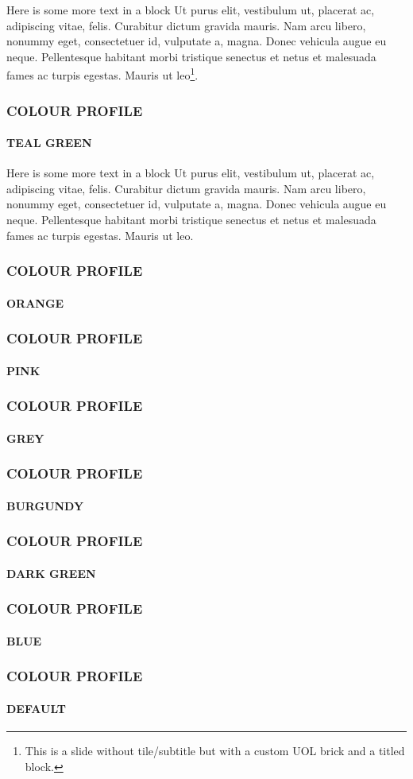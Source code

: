 \documentclass[
aspectratio=169,
]{beamer}
\begin{document}
\begin{frame}[uolcolours=Teal Green]
    \begin{block}{Here is some more text in a block}
        Ut purus elit, vestibulum ut, placerat ac, adipiscing vitae, felis. Curabitur dictum
gravida mauris. Nam arcu libero, nonummy eget, consectetuer id, vulputate a, magna.
Donec vehicula augue eu neque. Pellentesque habitant morbi tristique senectus et
netus et malesuada fames ac turpis egestas.
        Mauris ut leo\footnote{This is a slide without tile/subtitle but with a custom UOL brick and a titled block.}.
    \end{block}
\end{frame}
\begin{frame}[uolcolours=Teal Green]
    \frametitle{COLOUR PROFILE}
    \framesubtitle{TEAL GREEN}
    \democontent
\end{frame}

\begin{frame}
    \begin{block}{Here is some more text in a block}
        Ut purus elit, vestibulum ut, placerat ac, adipiscing vitae, felis. Curabitur dictum
gravida mauris. Nam arcu libero, nonummy eget, consectetuer id, vulputate a, magna.
Donec vehicula augue eu neque. Pellentesque habitant morbi tristique senectus et
netus et malesuada fames ac turpis egestas. Mauris ut leo.
    \end{block}
\end{frame}

\begin{frame}
    \frametitle{COLOUR PROFILE}
    \framesubtitle{ORANGE}
    \democontent
\end{frame}


\begin{frame}[uolcolours=Pink]
    \frametitle{COLOUR PROFILE}
    \framesubtitle{PINK}
    \democontent
\end{frame}

\begin{frame}[uolcolours=Grey]
    \frametitle{COLOUR PROFILE}
    \framesubtitle{GREY}
    \democontent
\end{frame}

\begin{frame}[uolcolours=Burgundy]
    \frametitle{COLOUR PROFILE}
    \framesubtitle{BURGUNDY}
    \democontent
\end{frame}

\begin{frame}[uolcolours=Dark Green]
    \frametitle{COLOUR PROFILE}
    \framesubtitle{DARK GREEN}
    \democontent
\end{frame}

\begin{frame}[uolcolours=Blue]
    \frametitle{COLOUR PROFILE}
    \framesubtitle{BLUE}
    \democontent
\end{frame}

\begin{frame}
    \frametitle{COLOUR PROFILE}
    \framesubtitle{DEFAULT}
    \democontent
\end{frame}
\end{document}
